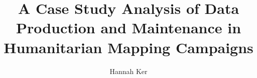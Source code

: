 \makeatletter
\renewcommand {\@degree@string} {Master Science}
\makeatother

\title{A Case Study Analysis of Data Production and Maintenance in Humanitarian Mapping Campaigns}
\author{Hannah Ker}

\maketitle